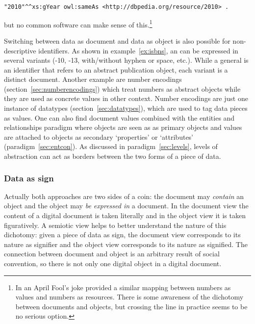 \begin{lstlisting}[language=turtle] 
 "2010"^^xs:gYear owl:sameAs <http://dbpedia.org/resource/2010> . 
\end{lstlisting} 

\noindent but no common  software can make sense of this.\footnote{In
an April Fool's joke \textcite{Vrandecic2010} provided a similar mapping
between numbers as values and numbers as resources. There is some awareness of
the dichotomy between documents and objects, but crossing the line in practice
seems to be no serious option.}

Switching between data as document and data as object is also possible for
non-descriptive identifiers.  As shown in example~\ref{ex:isbns}, an
 can be expressed in several variants (-10,
-13, with/without hyphen or space, etc.). While a general
 is an identifier that refers to an abstract publication object,
each variant is a distinct document.  Another example are number encodings
(section~\ref{sec:numberencodings}) which treat numbers as abstract objects
while they are used as concrete values in other context. Number encodings are
just one instance of datatypes (section~\ref{sec:datatypes}), which are used to
tag data pieces as values.  One can also find document values combined with the
entities and relationships paradigm where objects are seen as as primary
objects and values are attached to objects as secondary `properties' or
`attributes' (paradigm~\ref{sec:entcon}).  As discussed in
paradigm~\ref{sec:levels}, levels of abstraction can act as borders between the
two forms of a piece of data.

\subsubsection{Data as sign}
\label{sec:dataassign}

Actually both approaches are two sides of a coin: the document may {\em
contain} an object and the object may {\em be expressed in} a document. In the
document view the content of a digital document is taken literally and in the
object view it is taken figuratively. A semiotic view helps to better understand
the nature of this dichotomy: given a piece of data as sign, the document view
corresponds to its nature as signifier and the object view corresponds to its
nature as signified. The connection between document and object is an arbitrary 
result of social convention, so there is not only one digital object in a
digital document.

